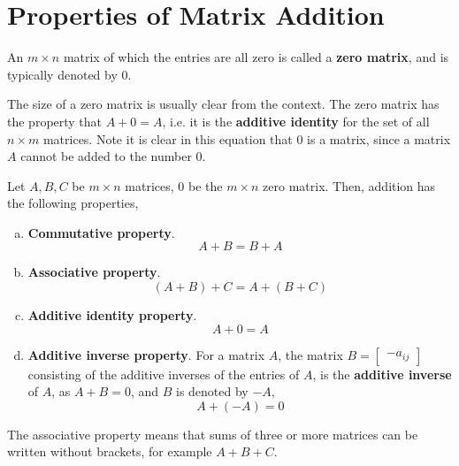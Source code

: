 \documentclass[letterpaper,12pt]{article}
\begin{document}
\section*{Properties of Matrix Addition}
\begin{definition}
An $m \times n$ matrix of which the entries are all zero is called a \textbf{zero matrix}, and is typically denoted by 0.
\end{definition}

The size of a zero matrix is usually clear from the context. The zero matrix has the property that $A + 0 = A$, i.e. it is the \textbf{additive identity} for the set of all $n \times m$ matrices. Note it is clear in this equation that 0 is a matrix, since a matrix $A$ cannot be added to the number 0.

\begin{theorem}
Let $A, B, C$ be $m \times n$ matrices, $0$ be the $m \times n$ zero matrix. Then, addition has the following properties,
\begin{enumerate}[(a)]
    \item \textbf{Commutative property}.
    \begin{equation*}
        A + B = B + A
    \end{equation*}
    \item \textbf{Associative property}.
    \begin{equation*}
        (A + B) + C = A + (B + C)
    \end{equation*}
    \item \textbf{Additive identity property}.
    \begin{equation*}
        A + 0 = A
    \end{equation*}
    \item \textbf{Additive inverse property}. For a matrix $A$, the matrix $B = \begin{bmatrix} -a_{ij} \end{bmatrix}$ consisting of the additive inverses of the entries of $A$, is the \textbf{additive inverse} of $A$, as $A + B = 0$, and $B$ is denoted by $-A$,
    \begin{equation*}
        A + (-A) = 0
    \end{equation*}
\end{enumerate}
\end{theorem}

The associative property means that sums of three or more matrices can be written without brackets, for example $A + B + C$.
\end{document}
